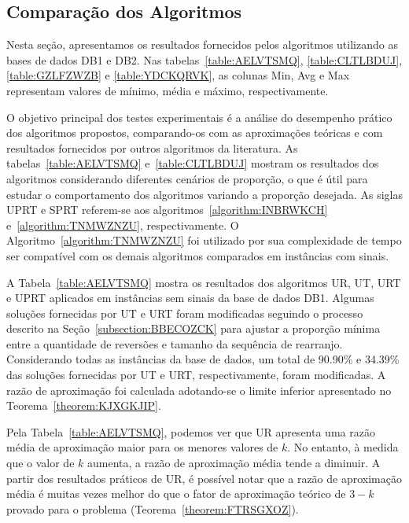 \subsection{Comparação dos Algoritmos}

Nesta seção, apresentamos os resultados fornecidos pelos algoritmos utilizando as bases de dados DB1 e DB2. Nas tabelas~\ref{table:AELVTSMQ}, \ref{table:CLTLBDUJ}, \ref{table:GZLFZWZB} e \ref{table:YDCKQRVK}, as colunas Min, Avg e Max representam valores de mínimo, média e máximo, respectivamente.

O objetivo principal dos testes experimentais é a análise do desempenho prático dos algoritmos propostos, comparando-os com as aproximações teóricas e com resultados fornecidos por outros algoritmos da literatura. As tabelas~\ref{table:AELVTSMQ} e~\ref{table:CLTLBDUJ} mostram os resultados dos algoritmos considerando diferentes cenários de proporção, o que é útil para estudar o comportamento dos algoritmos variando a proporção desejada. As siglas UPRT e SPRT referem-se aos algoritmos~\ref{algorithm:INBRWKCH} e~\ref{algorithm:TNMWZNZU}, respectivamente. O Algoritmo~\ref{algorithm:TNMWZNZU} foi utilizado por sua complexidade de tempo ser compatível com os demais algoritmos comparados em instâncias com sinais.

A Tabela~\ref{table:AELVTSMQ} mostra os resultados dos algoritmos UR, UT, URT e UPRT aplicados em instâncias sem sinais da base de dados DB1. Algumas soluções fornecidas por UT e URT foram modificadas seguindo o processo descrito na Seção~\ref{subsection:BBECOZCK} para ajustar a proporção mínima entre a quantidade de reversões e tamanho da sequência de rearranjo. Considerando todas as instâncias da base de dados, um total de 90.90\% e 34.39\% das soluções fornecidas por UT e URT, respectivamente, foram modificadas. A razão de aproximação foi calculada adotando-se o limite inferior apresentado no Teorema~\ref{theorem:KJXGKJIP}.



Pela Tabela~\ref{table:AELVTSMQ}, podemos ver que UR apresenta uma razão média de aproximação maior para os menores valores de $k$. No entanto, à medida que o valor de $k$ aumenta, a razão de aproximação média tende a diminuir. A partir dos resultados práticos de UR, é possível notar que a razão de aproximação média é muitas vezes melhor do que o fator de aproximação teórico de $3-k$ provado para o problema (Teorema~\ref{theorem:FTRSGXOZ}).

